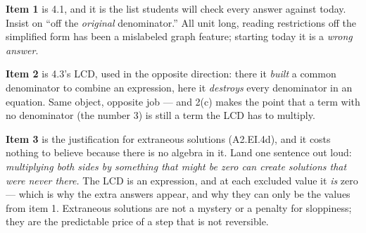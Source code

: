 \documentclass[10pt]{article}
\begin{document}
\begin{teachernote}
\textbf{Item 1} is 4.1, and it is the list students will check every answer against today. Insist on
``off the \emph{original} denominator.'' All unit long, reading restrictions off the simplified form has
been a mislabeled graph feature; starting today it is a \emph{wrong answer}.

\vspace{3pt}
\textbf{Item 2} is 4.3's LCD, used in the opposite direction: there it \emph{built} a common denominator
to combine an expression, here it \emph{destroys} every denominator in an equation. Same object,
opposite job --- and 2(c) makes the point that a term with no denominator (the number $3$) is still a
term the LCD has to multiply.

\vspace{3pt}
\textbf{Item 3} is the justification for extraneous solutions (A2.EI.4d), and it costs nothing to
believe because there is no algebra in it. Land one sentence out loud: \emph{multiplying both sides by
something that might be zero can create solutions that were never there.} The LCD is an expression, and
at each excluded value it \emph{is} zero --- which is why the extra answers appear, and why they can
only be the values from item 1. Extraneous solutions are not a mystery or a penalty for sloppiness;
they are the predictable price of a step that is not reversible.
\end{teachernote}
\end{document}
